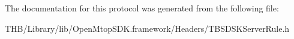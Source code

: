 The documentation for this protocol was generated from the following file\+:\begin{DoxyCompactItemize}
\item 
T\+H\+B/\+Library/lib/\+Open\+Mtop\+S\+D\+K.\+framework/\+Headers/T\+B\+S\+D\+S\+K\+Server\+Rule.\+h\end{DoxyCompactItemize}
